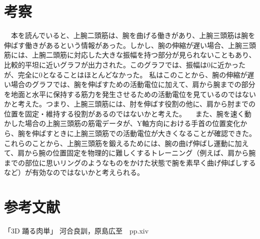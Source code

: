 \documentclass{jsarticle}
\begin{document}
\section{考察}
　本を読んでいると、上腕二頭筋は、腕を曲げる働きがあり、上腕三頭筋は腕を伸ばす働きがあるという情報があった\cite{reference}。しかし、腕の伸縮が遅い場合、上腕三頭筋には、上腕二頭筋に対応した大きな振幅を持つ部分が見られないこともあり、比較的平坦に近いグラフが出力された。このグラフでは、振幅は0に近かったが、完全に0となることはほとんどなかった。
私はこのことから、腕の伸縮が遅い場合のグラフでは、腕を伸ばすための活動電位に加えて、肩から腕までの部分を地面と水平に保持する筋力を発生させるための活動電位を見ているのではないかと考えた。つまり、上腕三頭筋には、肘を伸ばす役割の他に、肩から肘までの位置を固定・維持する役割があるのではないかと考えた。
　また、腕を速く動かした場合の上腕三頭筋の筋電データが、Y軸方向における手首の位置変化から、腕を伸ばすときに上腕三頭筋での活動電位が大きくなることが確認できた。
これらのことから、上腕三頭筋を鍛えるためには、腕の曲げ伸ばし運動に加えて、肩から腕の位置固定を物理的に難しくするトレーニング（例えば、肩から腕までの部位に思いリングのようなものをかけた状態で腕を素早く曲げ伸ばしするなど）が有効なのではないかと考えられる。

\section{参考文献}
\begin{thebibliography}{9}
   「3D 踊る肉単」 河合良訓，原島広至　pp.xiv
\end{thebibliography}
\end{document}
